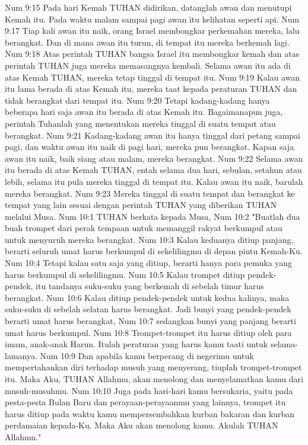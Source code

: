 Num 9:15  Pada hari Kemah TUHAN didirikan, datanglah awan dan menutupi Kemah itu. Pada waktu malam sampai pagi awan itu kelihatan seperti api.
Num 9:17  Tiap kali awan itu naik, orang Israel membongkar perkemahan mereka, lalu berangkat. Dan di mana awan itu turun, di tempat itu mereka berkemah lagi.
Num 9:18  Atas perintah TUHAN bangsa Israel itu membongkar kemah dan atas perintah TUHAN juga mereka memasangnya kembali. Selama awan itu ada di atas Kemah TUHAN, mereka tetap tinggal di tempat itu.
Num 9:19  Kalau awan itu lama berada di atas Kemah itu, mereka taat kepada peraturan TUHAN dan tidak berangkat dari tempat itu.
Num 9:20  Tetapi kadang-kadang hanya beberapa hari saja awan itu berada di atas Kemah itu. Bagaimanapun juga, perintah Tuhanlah yang menentukan mereka tinggal di suatu tempat atau berangkat.
Num 9:21  Kadang-kadang awan itu hanya tinggal dari petang sampai pagi, dan waktu awan itu naik di pagi hari, mereka pun berangkat. Kapan saja awan itu naik, baik siang atau malam, mereka berangkat.
Num 9:22  Selama awan itu berada di atas Kemah TUHAN, entah selama dua hari, sebulan, setahun atau lebih, selama itu pula mereka tinggal di tempat itu. Kalau awan itu naik, barulah mereka berangkat.
Num 9:23  Mereka tinggal di suatu tempat dan berangkat ke tempat yang lain sesuai dengan perintah TUHAN yang diberikan TUHAN melalui Musa.
Num 10:1  TUHAN berkata kepada Musa,
Num 10:2  "Buatlah dua buah trompet dari perak tempaan untuk memanggil rakyat berkumpul atau untuk menyuruh mereka berangkat.
Num 10:3  Kalau keduanya ditiup panjang, berarti seluruh umat harus berkumpul di sekelilingmu di depan pintu Kemah-Ku.
Num 10:4  Tetapi kalau satu saja yang ditiup, berarti hanya para pemuka yang harus berkumpul di sekelilingmu.
Num 10:5  Kalau trompet ditiup pendek-pendek, itu tandanya suku-suku yang berkemah di sebelah timur harus berangkat.
Num 10:6  Kalau ditiup pendek-pendek untuk kedua kalinya, maka suku-suku di sebelah selatan harus berangkat. Jadi bunyi yang pendek-pendek berarti umat harus berangkat,
Num 10:7  sedangkan bunyi yang panjang berarti umat harus berkumpul.
Num 10:8  Trompet-trompet itu harus ditiup oleh para imam, anak-anak Harun. Itulah peraturan yang harus kamu taati untuk selama-lamanya.
Num 10:9  Dan apabila kamu berperang di negerimu untuk mempertahankan diri terhadap musuh yang menyerang, tiuplah trompet-trompet itu. Maka Aku, TUHAN Allahmu, akan menolong dan menyelamatkan kamu dari musuh-musuhmu.
Num 10:10  Juga pada hari-hari kamu bersukaria, yaitu pada pesta-pesta Bulan Baru dan perayaan-perayaanmu yang lainnya, trompet itu harus ditiup pada waktu kamu mempersembahkan kurban bakaran dan kurban perdamaian kepada-Ku. Maka Aku akan menolong kamu. Akulah TUHAN Allahmu."
